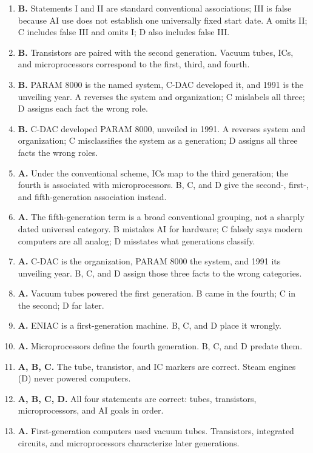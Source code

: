 \begin{enumerate}[label=\textbf{Q\arabic*.}, leftmargin=*]
  cue, not the third. A, B, and D are the correct first-, second-, and
  fourth-generation pairings.
\item \textbf{B.} Statements I and II are standard conventional
  associations; III is false because AI use does not establish one
  universally fixed start date. A omits II; C includes false III and omits
  I; D also includes false III.
\item \textbf{B.} Transistors are paired with the second generation. Vacuum
  tubes, ICs, and microprocessors correspond to the first, third, and fourth.
\item \textbf{B.} PARAM 8000 is the named system, C-DAC developed it, and
  1991 is the unveiling year. A reverses the system and organization; C
  mislabels all three; D assigns each fact the wrong role.
\item \textbf{B.} C-DAC developed PARAM 8000, unveiled in 1991. A reverses
  system and organization; C misclassifies the system as a generation; D
  assigns all three facts the wrong roles.
\item \textbf{A.} Under the conventional scheme, ICs map to the third
  generation; the fourth is associated with microprocessors. B, C, and D
  give the second-, first-, and fifth-generation association instead.
\item \textbf{A.} The fifth-generation term is a broad conventional grouping,
  not a sharply dated universal category. B mistakes AI for hardware; C
  falsely says modern computers are all analog; D misstates what
  generations classify.
\item \textbf{A.} C-DAC is the organization, PARAM 8000 the system, and
  1991 its unveiling year. B, C, and D assign those three facts to the wrong
  categories.

\item \textbf{A.} Vacuum tubes powered the first generation. B came in the fourth; C in the second; D far later.
\item \textbf{A.} ENIAC is a first-generation machine. B, C, and D place it wrongly.
\item \textbf{A.} Microprocessors define the fourth generation. B, C, and D predate them.
\item \textbf{A, B, C.} The tube, transistor, and IC markers are correct. Steam engines (D) never powered computers.
\item \textbf{A, B, C, D.} All four statements are correct: tubes, transistors, microprocessors, and AI goals in order.
\item \textbf{A.} First-generation computers used vacuum tubes. Transistors, integrated circuits, and microprocessors characterize later generations.


\end{enumerate}
